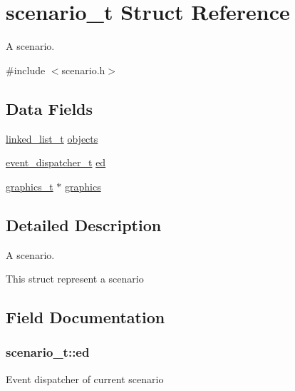 \hypertarget{structscenario__t}{}\section{scenario\+\_\+t Struct Reference}
\label{structscenario__t}


A scenario.  




{\ttfamily \#include $<$scenario.\+h$>$}

\subsection*{Data Fields}
\begin{DoxyCompactItemize}
\item 
\hyperlink{structlinked__list__t}{linked\+\_\+list\+\_\+t} \hyperlink{structscenario__t_ab01a8a6fa25d26374ff9b261e7512c1c}{objects}
\item 
\hyperlink{structevent__dispatcher__t}{event\+\_\+dispatcher\+\_\+t} \hyperlink{structscenario__t_a8687b4f6cafb5c9d4e1b324cc8d5c7c9}{ed}
\item 
\hyperlink{structgraphics__t}{graphics\+\_\+t} $\ast$ \hyperlink{structscenario__t_a00790b5954aa1761fec84cbd3319ed16}{graphics}
\end{DoxyCompactItemize}


\subsection{Detailed Description}
A scenario. 

This struct represent a scenario 

\subsection{Field Documentation}
\subsubsection[{\texorpdfstring{ed}{ed}}]{ scenario\+\_\+t\+::ed}\hypertarget{structscenario__t_a8687b4f6cafb5c9d4e1b324cc8d5c7c9}{}\label{structscenario__t_a8687b4f6cafb5c9d4e1b324cc8d5c7c9}
Event dispatcher of current scenario 
